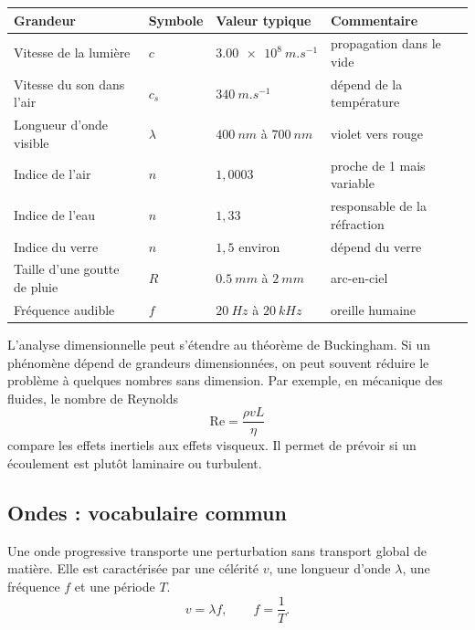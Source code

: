 \documentclass[11pt,a4paper]{article}
\begin{document}
\begin{odgbox}
\begin{center}
\begin{tabularx}{\textwidth}{lllX}
\toprule
Grandeur & Symbole & Valeur typique & Commentaire\\
\midrule
Vitesse de la lumière & $c$ & $\SI{3.00e8}{m.s^{-1}}$ & propagation dans le vide\\
Vitesse du son dans l'air & $c_s$ & $\SI{340}{m.s^{-1}}$ & dépend de la température\\
Longueur d'onde visible & $\lambda$ & $\SI{400}{nm}$ à $\SI{700}{nm}$ & violet vers rouge\\
Indice de l'air & $n$ & $1{,}0003$ & proche de 1 mais variable\\
Indice de l'eau & $n$ & $1{,}33$ & responsable de la réfraction\\
Indice du verre & $n$ & $1{,}5$ environ & dépend du verre\\
Taille d'une goutte de pluie & $R$ & $\SI{0.5}{mm}$ à $\SI{2}{mm}$ & arc-en-ciel\\
Fréquence audible & $f$ & $\SI{20}{Hz}$ à $\SI{20}{kHz}$ & oreille humaine\\
\bottomrule
\end{tabularx}
\end{center}
\end{odgbox}

\begin{approfondissementbox}
L'analyse dimensionnelle peut s'étendre au théorème de Buckingham. Si un phénomène dépend de grandeurs dimensionnées, on peut souvent réduire le problème à quelques nombres sans dimension. Par exemple, en mécanique des fluides, le nombre de Reynolds
\[
\mathrm{Re}=\frac{\rho vL}{\eta}
\]
compare les effets inertiels aux effets visqueux. Il permet de prévoir si un écoulement est plutôt laminaire ou turbulent.
\end{approfondissementbox}

\subsection{Ondes : vocabulaire commun}

\begin{definitionbox}
Une onde progressive transporte une perturbation sans transport global de matière. Elle est caractérisée par une célérité $v$, une longueur d'onde $\lambda$, une fréquence $f$ et une période $T$.
\[
v=\lambda f,\qquad f=\frac1T.
\]
\end{definitionbox}
\end{document}
